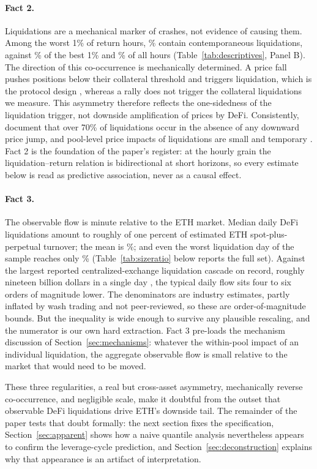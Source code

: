 \paragraph{Fact 2.}
Liquidations are a mechanical marker of crashes, not evidence of causing them.
Among the worst 1\% of return hours, \PLiqWorstOne\% contain
contemporaneous liquidations, against \PLiqBestOne\% of the best 1\% and
\PLiqAll\% of all hours (Table~\ref{tab:descriptives}, Panel B).
The direction of this co-occurrence is mechanically determined. A price
fall pushes positions below their collateral threshold and triggers
liquidation, which is the protocol design \citep{qin2021,perez2021},
whereas a rally does not trigger the collateral liquidations we measure. This asymmetry therefore
reflects the one-sidedness of the liquidation trigger, not downside
amplification of prices by DeFi. Consistently, \citet{moallemi2024}
document that over 70\% of liquidations occur in the absence of any
downward price jump, and pool-level price impacts of liquidations are small and temporary \citep{tian2025}. Fact 2 is the foundation of the paper's
register: at the hourly grain the liquidation--return relation is
bidirectional at short horizons, so every estimate below is read as
predictive association, never as a causal effect.

\paragraph{Fact 3.}
The observable flow is minute relative to the ETH market.
Median daily DeFi liquidations amount to roughly \SizeMedianShare{} of one percent
of estimated ETH spot-plus-perpetual turnover; the mean is
\SizeShareMean\%; and even the worst liquidation day of the sample reaches
only \SizeShareWorstDay\% (Table~\ref{tab:sizeratio} below reports the full
set). Against the largest reported centralized-exchange liquidation cascade on
record, roughly nineteen billion dollars in a single day
\citep{coinglass2025}, the typical daily flow sits four to six orders of
magnitude lower. The denominators are industry estimates, partly inflated
by wash trading and not peer-reviewed, so these are order-of-magnitude
bounds. But the inequality is wide enough to survive any plausible
rescaling, and the numerator is our own hard extraction. Fact 3 pre-loads the mechanism discussion of
Section~\ref{sec:mechanisms}: whatever the within-pool impact of an
individual liquidation, the aggregate observable flow is small relative to
the market that would need to be moved.

\medskip
\noindent
These three regularities, a real but cross-asset asymmetry, mechanically
reverse co-occurrence, and negligible scale, make it doubtful from the
outset that observable DeFi liquidations drive ETH's downside tail. The
remainder of the paper tests that doubt formally: the next section fixes
the specification, Section~\ref{sec:apparent} shows how a naive
quantile analysis nevertheless appears to confirm the leverage-cycle
prediction, and Section~\ref{sec:deconstruction} explains why that
appearance is an artifact of interpretation.